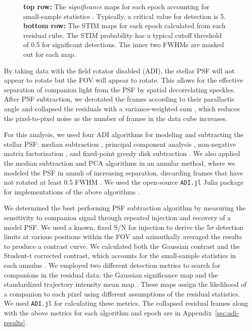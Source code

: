 \documentclass[twocolumn]{aastex631}
\begin{document}
\begin{figure*}
    \centering
    \caption{\textbf{top row:} The \textit{significance} maps for each epoch accounting for small-sample statistics \citep{mawetFundamentalLimitationsHigh2014}. Typically, a critical value for detection is 5. \textbf{bottom row:} The STIM maps for each epoch calculated from each residual cube. The STIM probability has a typical cutoff threshold of 0.5 for significant detections. The inner two FWHMs are masked out for each map.}
    \label{fig:detection}
\end{figure*}

By taking data with the field rotator disabled (ADI), the stellar PSF will not appear to rotate but the FOV will appear to rotate. This allows for the effective separation of companion light from the PSF by spatial decorrelating speckles.  After PSF subtraction, we derotated the frames according to their parallactic angle and collapsed the residuals with a variance-weighted sum \citep{bottomNoiseweightedAngularDifferential2017a}, which reduces the pixel-to-pixel noise as the number of frames in the data cube increases.

For this analysis, we used four ADI algorithms for modeling and subtracting the stellar PSF: median subtraction \citep{maroisAngularDifferentialImaging2006}, principal component analysis \citep[PCA, also referred to as KLIP;][]{soummerDetectionCharacterizationExoplanets2012a}, non-negative matrix factorization \citep[NMF;][]{renNonnegativeMatrixFactorization2018a}, and fixed-point greedy disk subtraction \citep[GreeDS;][]{pairetReferencelessAlgorithmCircumstellar2019a,pairetMAYONNAISEMorphologicalComponents2020}. We also applied the median subtraction and PCA algorithms in an annular method, where we modeled the PSF in annuli of increasing separation, discarding frames that have not rotated at least 0.5 FWHM \citep{maroisAngularDifferentialImaging2006}. We used the open-source \texttt{ADI.jl} Julia package for implementations of the above algorithms \citep{lucasADIJlJulia2020}.

We determined the best performing PSF subtraction algorithm by measuring the sensitivity to companion signal through repeated injection and recovery of a model PSF. We used a known, fixed S/N for injection to derive the 5$\sigma$ detection limits at various positions within the FOV and azimuthally averaged the results to produce a contrast curve. We calculated both the Gaussian contrast and the Student-t corrected contrast, which accounts for the small-sample statistics in each annulus \citep{mawetFundamentalLimitationsHigh2014}. We employed two different detection metrics to search for companions in the residual data: the Gaussian significance map \citep{mawetFundamentalLimitationsHigh2014} and the standardized trajectory intensity mean map \citep[STIM map;][]{pairetSTIMMapDetection2019}. These maps assign the likelihood of a companion to each pixel using different assumptions of the residual statistics. We used \texttt{ADI.jl} for calculating these metrics. The collapsed residual frames along with the above metrics for each algorithm and epoch are in Appendix~\ref{sec:adi-results}.
\end{document}
